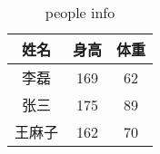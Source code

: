 \documentclass[UTF8,fontset=ubuntu]{ctexart}
\begin{document}
%	
%	
%	
%	
%	

	\begin{table}
	\centering
	\begin{tabular}{c c c}
		\hline
		姓名 & 身高 & 体重\\\hline
		李磊 & 169 & 62\\
		张三 & 175 & 89\tablefootnote{非常肥胖}\\
		王麻子 & 162 & 70\\\hline
	\end{tabular}
	\caption{people info}
	\end{table}


\end{document}
